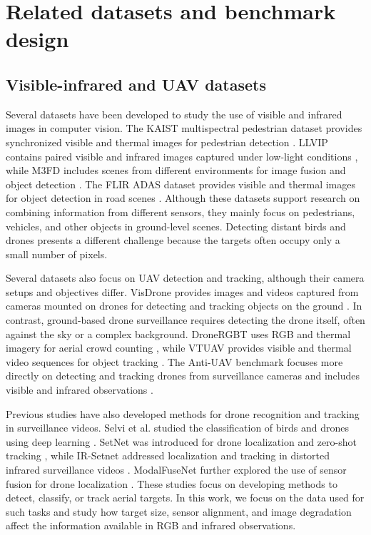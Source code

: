 \documentclass[10pt]{article}
\begin{document}
\section{Related datasets and benchmark design}
\label{sec:related}

\subsection{Visible-infrared and UAV datasets}

Several datasets have been developed to study the use of visible and infrared images in computer vision. The KAIST multispectral pedestrian dataset provides synchronized visible and thermal images for pedestrian detection \citep{hwang2015kaist}. LLVIP contains paired visible and infrared images captured under low-light conditions \citep{jia2021llvip}, while M3FD includes scenes from different environments for image fusion and object detection \citep{liu2022tardal}. The FLIR ADAS dataset provides visible and thermal images for object detection in road scenes \citep{flir2018adas}. Although these datasets support research on combining information from different sensors, they mainly focus on pedestrians, vehicles, and other objects in ground-level scenes. Detecting distant birds and drones presents a different challenge because the targets often occupy only a small number of pixels.

Several datasets also focus on UAV detection and tracking, although their camera setups and objectives differ. VisDrone provides images and videos captured from cameras mounted on drones for detecting and tracking objects on the ground \citep{zhu2022visdrone}. In contrast, ground-based drone surveillance requires detecting the drone itself, often against the sky or a complex background. DroneRGBT uses RGB and thermal imagery for aerial crowd counting \citep{peng2020dronergbt}, while VTUAV provides visible and thermal video sequences for object tracking \citep{zhang2022vtuav}. The Anti-UAV benchmark focuses more directly on detecting and tracking drones from surveillance cameras and includes visible and infrared observations \citep{jiang2023antiuav,antiuavrepo}.

Previous studies have also developed methods for drone recognition and tracking in surveillance videos. Selvi et al. studied the classification of birds and drones using deep learning \citep{selvi2022deep}. SetNet was introduced for drone localization and zero-shot tracking \citep{10193217}, while IR-Setnet addressed localization and tracking in distorted infrared surveillance videos \citep{10328384}. ModalFuseNet further explored the use of sensor fusion for drone localization \citep{11700652}. These studies focus on developing methods to detect, classify, or track aerial targets. In this work, we focus on the data used for such tasks and study how target size, sensor alignment, and image degradation affect the information available in RGB and infrared observations.
\end{document}
